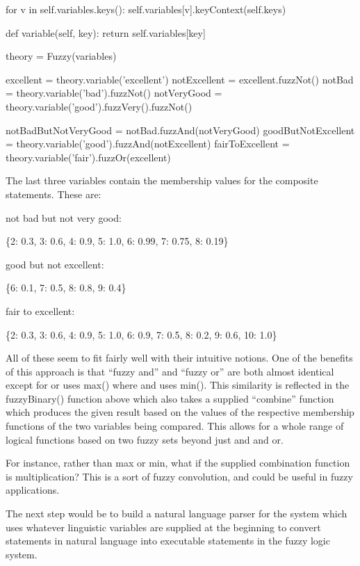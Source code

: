 \documentclass[12pt]{article}
\begin{document}
\begin{python}[]
        for v in self.variables.keys():
            self.variables[v].keyContext(self.keys)

    def variable(self, key):
        return self.variables[key]

theory = Fuzzy(variables)

excellent = theory.variable('excellent')
notExcellent = excellent.fuzzNot()
notBad = theory.variable('bad').fuzzNot()
notVeryGood = theory.variable('good').fuzzVery().fuzzNot()

notBadButNotVeryGood = notBad.fuzzAnd(notVeryGood)
goodButNotExcellent = theory.variable('good').fuzzAnd(notExcellent)
fairToExcellent = theory.variable('fair').fuzzOr(excellent)
\end{python}

The last three variables contain the membership values for the composite statements.  These are:

not bad but not very good:

\{2: 0.3,
 3: 0.6,
 4: 0.9,
 5: 1.0,
 6: 0.99,
 7: 0.75,
 8: 0.19\}

good but not excellent:

\{6: 0.1,
 7: 0.5,
 8: 0.8,
 9: 0.4\}

fair to excellent:

\{2: 0.3,
 3: 0.6,
 4: 0.9,
 5: 1.0,
 6: 0.9,
 7: 0.5,
 8: 0.2,
 9: 0.6,
 10: 1.0\}

All of these seem to fit fairly well with their intuitive notions.  One of the benefits of this approach is that ``fuzzy and'' and ``fuzzy or'' are both almost identical except for or uses max() where and uses min().  This similarity is reflected in the fuzzyBinary() function above which also takes a supplied ``combine'' function which produces the given result based on the values of the respective membership functions of the two variables being compared.  This allows for a whole range of logical functions based on two fuzzy sets beyond just and and or.

For instance, rather than max or min, what if the supplied combination function is multiplication?  This is a sort of fuzzy convolution, and could be useful in fuzzy applications.

The next step would be to build a natural language parser for the system which uses whatever linguistic variables are supplied at the beginning to convert statements in natural language into executable statements in the fuzzy logic system.  
\end{document}
